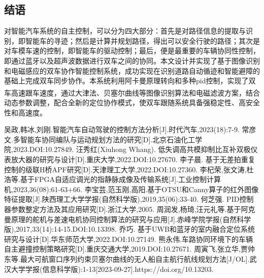 \documentclass{article}%
\begin{document}
\begin{multicols}{2}
		\section{结语}
		对智能汽车系统的自主控制，可以分为四大部分：首先是对路径信息的提取与识别，即智能车的寻迹；然后是计算并规划路径，得出可以安全行驶的路径；其次是对车模车速的控制，即智能车的驱动控制；最后，便是最重要的车辆协同性控制，即通过蓝牙以及超声波数据进行双车之间的协同。本文设计并实现了基于图像识别和电磁感应的双车协作智能控制系统，成功实现在识别道路自动循迹和智能避障的基础上完成双车同步协作。本系统利用阿卡曼原理转向和多种pid控制，实现了双车高速跟车速度，通过大津法、贝塞尔曲线\textsuperscript{\cite{ref11}}等图像识别算法和电磁滤波方案，结合动态参数调整，配合全新的定位协作模式，使双车跟随系统具备强稳定性、高安全性和高速度。
				
		\begin{thebibliography}{15}%
			
			吴政,韩冰,刘刚.智能汽车自动驾驶的控制方法分析[J].时代汽车,2023(18):7-9.			
			常彦文.多智能车协同编队与运动规划方法的研究[D].北京石油化工学院,2023.DOI:10.27849.
			汪秀红(Xiuhong Whang). 低失调高共模抑制比互补双极仪表放大器的研究与设计[D].重庆大学,2022.DOI:10.27670.
			李子晨. 基于无差拍重复控制的级联H桥APF研究[D].天津理工大学,2022.DOI:10.27360.
			李杞荣,张文涛,杜浩等.基于FPGA自适应调光的指静脉成像及传输系统[J].工业控制计算机,2023,36(08):61-63+66.
			李宝芸,范玉刚,高阳.基于OTSU和Canny算子的红外图像特征提取[J].陕西理工大学学报(自然科学版),2019,35(06):33-40.
			何芝强. PID控制器参数整定方法及其应用研究[D].浙江大学,2005.
			周润发,杨琦,汪元礼等.基于阿克曼原理的舵机与差速电机协同控制算法的研究与应用[J].赤峰学院学报(自然科学版),2017,33(14):14-15.DOI:10.13398.
			乔巧. 基于UWB和蓝牙的室内融合定位系统研究与设计[D].华东师范大学,2022.DOI:10.27149.
			熊永伟.车路协同环境下的车辆自主避撞控制策略研究[D].重庆交通大学,2019.DOI:10.27671.
			周寅飞,张立华,贾帅东等.最大可航窗口序列约束贝塞尔曲线的无人船自主航行航线规划方法[J/OL].武汉大学学报(信息科学版):1-13[2023-09-27].https://doi.org/10.13203.
		\end{thebibliography}
		
	\end{multicols}%
	
		
\end{document}
